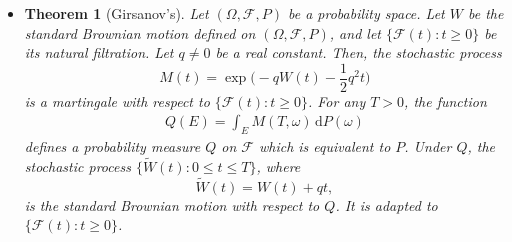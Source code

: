 \documentclass[10pt]{article}
\newtheorem{theorem}[lemma]{Theorem}
\newcommand{\dee}{\mathrm{d}}
\newcommand{\mcal}[1]{\mathcal{#1}}
\begin{document}
\begin{itemize}
  \item \begin{theorem}[Girsanov's]
    Let $(\Omega, \mcal{F}, P)$ be a probability space. Let $W$ be the standard Brownian motion defined on $(\Omega, \mcal{F}, P)$, and let $\{ \mcal{F}(t) : t \geq 0 \}$ be its natural filtration. Let $q \neq 0$ be a real constant. Then, the stochastic process
    $$M(t) = \exp\bigg( -q W(t) - \frac{1}{2} q^2 t \bigg)$$ is a martingale with respect to $\{ \mcal{F}(t) : t \geq 0 \}$. For any $T > 0$, the function
    \begin{align*}
      Q(E) = \int_E M(T, \omega)\, \dee P(\omega)
    \end{align*}
    defines a probability measure $Q$ on $\mcal{F}$ which is equivalent to $P$. Under $Q$, the stochastic process $\{\widetilde{W}(t) : 0 \leq t \leq T\}$, where $$\widetilde{W}(t) = W(t) + qt,$$ is the standard Brownian motion with respect to $Q$. It is adapted to $\{ \mcal{F}(t) : t \geq 0 \}$.
  \end{theorem}


\end{itemize}
\end{document}
